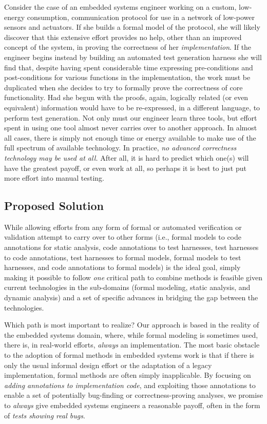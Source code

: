 Consider the case of an embedded systems engineer working on a custom, low-energy consumption, communication protocol for use in a network of low-power sensors and actuators.  If she builds a formal model of the protocol, she will likely discover that this extensive effort provides no help, other than an improved concept of the system, in proving the correctness of her \emph{implementation}.  If the engineer begins instead by building an automated test generation harness she will find that, despite having spent considerable time expressing pre-conditions and post-conditions for various functions in the implementation, the work must be duplicated when she decides to try to formally prove the correctness of core functionality.  Had she begun with the proofs, again, logically related (or even equivalent) information would have to be re-expressed, in a different language, to perform test generation.  Not only must our engineer learn three tools, but effort spent in using one tool almost never carries over to another approach.  In almost all cases, there is simply not enough time or energy available to make use of the full spectrum of available technology.  In practice, \emph{no advanced correctness technology may be used at all.}  After all, it is hard to predict which one(s) will have the greatest payoff, or even work at all, so perhaps it is best to just put more effort into manual testing.

\subsection{Proposed Solution}

While allowing efforts from any form of formal or automated verification or validation attempt to carry over to other forms (i.e., formal models to code annotations for static analysis, code annotations to test harnesses, test harnesses to code annotations, test harnesses to formal models, formal models to test harnesses, and code annotations to formal models) is the ideal goal, simply making it possible to follow \emph{one} critical path to combine methods is feasible given current technologies in the sub-domains (formal modeling, static analysis, and dynamic analysis) and a set of specific advances in bridging the gap between the technologies.

Which path is most important to realize?  Our approach is based in the reality of the embedded systems domain, where, while formal modeling is sometimes used, there is, in real-world efforts, \emph{always} an implementation.  The most basic obstacle to the adoption of formal methods in embedded systems work is that if there is only the usual informal design effort or the adaptation of a legacy implementation, formal methods are often simply inapplicable.  By focusing on \emph{adding annotations to implementation code}, and exploiting those annotations to enable a set of potentially bug-finding or correctness-proving analyses, we promise to \emph{always} give embedded systems engineers a reasonable payoff, often in the form of \emph{tests showing real bugs}.

